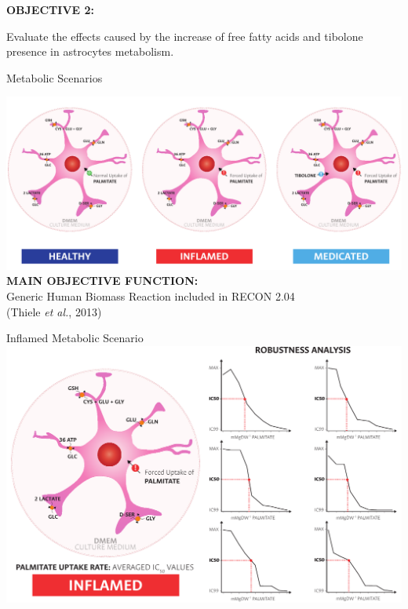 \documentclass[11pt]{beamer}
\begin{document}
\begin{frame}
\begin{block}{\textbf{OBJECTIVE 2:}}
\begin{center}
Evaluate the effects caused by the increase of free fatty acids and tibolone presence in astrocytes metabolism.\end{center}\end{block}
\end{frame}
\begin{frame}{Metabolic Scenarios}
\begin{center}
\includegraphics[width=\textwidth]{Healthy}\\
\textbf{MAIN OBJECTIVE FUNCTION:}\\Generic Human Biomass Reaction included in RECON 2.04 \\(Thiele \textit{et al.}, 2013)
\end{center}
\end{frame}
\begin{frame}{Inflamed Metabolic Scenario}
\includegraphics[width=\textwidth]{Inflamed}
\end{frame}
\end{document}
